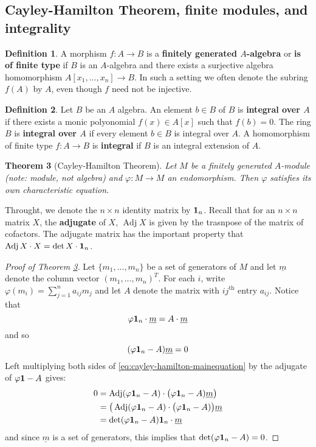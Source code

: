\documentclass[12pt]{article}
\theoremstyle{plain}
\newtheorem{thm}{Theorem}[subsection] %
\theoremstyle{definition}
\newtheorem{defn}[thm]{Definition} %
\begin{document}
\subsection{Cayley-Hamilton Theorem, finite modules, and integrality}
\begin{defn}
A morphism $f:A \to B$ is a \textbf{finitely generated $A$-algebra} or \textbf{is of finite type} if $B$ is an $A$-algebra and there exists a surjective algebra homomorphism $A[x_1,...,x_n] \to B$. In such a setting we often denote the subring $f(A)$ by $A$, even though $f$ need not be injective.
\end{defn}
\begin{defn}
Let $B$ be an $A$ algebra. An element $b\in B$ of $B$ is \textbf{integral over $A$} if there exists a monic polyonomial $f(x) \in A[x]$ such that $f(b) = 0$. The ring $B$ is \textbf{integral over $A$} if every element $b \in B$ is integral over $A$. A homomorphism of finite type $f: A \to B$ is \textbf{integral} if $B$ is an integral extension of $A$.
\end{defn}
\begin{thm}[Cayley-Hamilton Theorem]\label{thm:cayley_hamilton}
Let $M$ be a finitely generated $A$-module (note: module, not algebra) and $\varphi: M \to M$ an endomorphism. Then $\varphi$ satisfies its own characteristic equation.
\end{thm}
Throught, we denote the $n\times n$ identity matrix by $\bold{1}_n$. Recall that for an $n \times n$ matrix $X$, the \textbf{adjugate} of $X$, $\operatorname{Adj}X$ is given by the trasnpose of the matrix of cofactors. The adjugate matrix has the important property that $\operatorname{Adj}X\cdot X = \operatorname{det}X\cdot \bold{1}_n$.
\begin{proof}[Proof of Theorem \ref{thm:cayley_hamilton}]
Let $\lbrace m_1,...,m_n\rbrace$ be a set of generators of $M$ and let $\underline{m}$ denote the column vector $(m_1,...,m_n)^T$. For each $i$, write $\varphi(m_i) = \sum_{j = 1}^n a_{ij}m_j$ and let $A$ denote the matrix with $ij^\text{th}$ entry $a_{ij}$. Notice that
\begin{equation}
    \varphi \bold{1}_n\cdot \underline{m} = A\cdot \underline{m}
\end{equation}
and so
\begin{equation}\label{eq:cayley-hamilton-mainequation}
    (\varphi \bold{1}_n - A) \underline{m} = 0
\end{equation}
Left multiplying both sides of \eqref{eq:cayley-hamilton-mainequation} by the adjugate of $\varphi\bold{1} - A$ gives:
\begin{align*}
    0 &= \operatorname{Adj}(\varphi \bold{1}_n - A)\cdot \big(\varphi \bold{1}_n - A)\underline{m}\big)\\
    &= \big(\operatorname{Adj}(\varphi \bold{1}_n - A)\cdot \big(\varphi \bold{1}_n - A)\big)\underline{m}\\
    &= \operatorname{det}(\varphi \bold{1}_n - A)\bold{1}_n \cdot \underline{m}
\end{align*}
and since $\underline{m}$ is a set of generators, this implies that $\operatorname{det}(\varphi \bold{1}_n - A) = 0$.
\end{proof}
\end{document}
